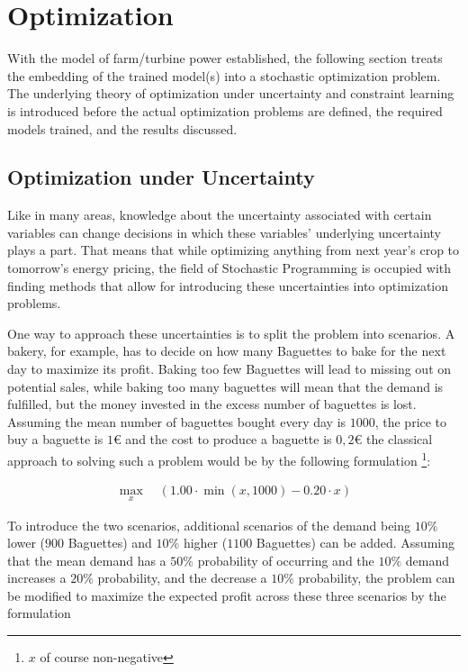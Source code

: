 \chapter{Optimization}\label{section:optimization}

With the model of farm/turbine power established, the following section treats the embedding of the trained model(s)  into a stochastic optimization problem. The underlying theory of optimization under uncertainty and constraint learning is introduced before the actual optimization problems are defined, the required models trained, and the results discussed.

\section{Optimization under Uncertainty}

Like in many areas, knowledge about the uncertainty associated with certain variables can change decisions in which these variables' underlying uncertainty plays a part. That means that while optimizing anything from next year's crop to tomorrow's energy pricing, the field of Stochastic Programming is occupied with finding methods that allow for introducing these uncertainties into optimization problems.

One way to approach these uncertainties is to split the problem into scenarios. A bakery, for example, has to decide on how many Baguettes to bake for the next day to maximize its profit. Baking too few Baguettes will lead to missing out on potential sales, while baking too many baguettes will mean that the demand is fulfilled, but the money invested in the excess number of baguettes is lost. Assuming the mean number of baguettes bought every day is $1000$, the price to buy a baguette is $1 €$ and the cost to produce a baguette is $0,2 €$ the classical approach to solving such a problem would be by the following formulation \footnote{$x$ of course non-negative}: 


\begin{align*}
	\max_{x} \quad \left( 1.00 \cdot \min(x,1000) - 0.20 \cdot x \right)
\end{align*}


To introduce the two scenarios, additional scenarios of the demand being $10\%$ lower ($900$ Baguettes) and $10\%$ higher ($1100$ Baguettes) can be added. Assuming that the mean demand has a $50\%$ probability of occurring and the $10\%$ demand increases a $20\%$ probability, and the decrease a $10\%$  probability, the problem can be modified to maximize the expected profit across these three scenarios by the formulation

